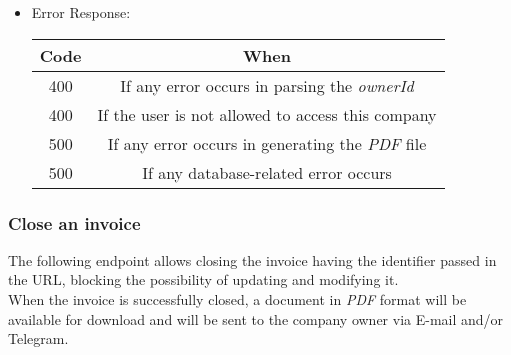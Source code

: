 \begin{itemize}
    \item Error Response:
    \begin{table}[!h]
    \centering
    \begin{tabular}{|c|c|}
    \hline
    \multicolumn{1}{|c|}{\textbf{Code}} & \multicolumn{1}{c|}{\textbf{When}} \\ \hline
    400 & If any error occurs in parsing the \textit{ownerId}  \\\hline
    400 & If the user is not allowed to access this company \\\hline
    500 & If any error occurs in generating the \textit{PDF} file \\\hline
    500 & If any database-related error occurs \\\hline
    \end{tabular}
    \end{table}

\end{itemize}


\newpage
\subsubsection*{Close an invoice}

The following endpoint allows closing the invoice having the identifier passed in the URL, blocking the possibility of updating and modifying it. \\
When the invoice is successfully closed, a document in \textit{PDF} format will be available for download and will be sent to the company owner via E-mail and/or Telegram.

